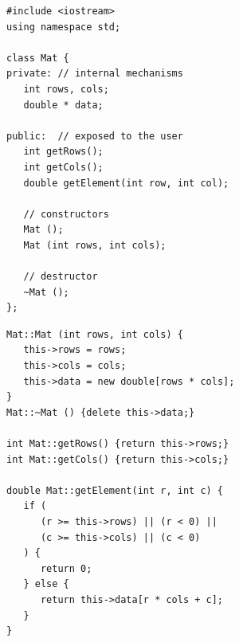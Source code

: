 \begin{frame}[fragile]
%
%
\begin{codebox}
\begin{verbatim}
#include <iostream>
using namespace std;

class Mat {
private: // internal mechanisms
   int rows, cols;
   double * data;
   
public:  // exposed to the user
   int getRows();
   int getCols();
   double getElement(int row, int col);

   // constructors
   Mat ();
   Mat (int rows, int cols);

   // destructor
   ~Mat ();
};
\end{verbatim}
\end{codebox}
%	
\begin{codebox}[... Fortsetzung ...]
\begin{verbatim}
Mat::Mat (int rows, int cols) {
   this->rows = rows;
   this->cols = cols;
   this->data = new double[rows * cols];
}
Mat::~Mat () {delete this->data;}

int Mat::getRows() {return this->rows;}
int Mat::getCols() {return this->cols;}

double Mat::getElement(int r, int c) {
   if (
      (r >= this->rows) || (r < 0) ||
      (c >= this->cols) || (c < 0)
   ) {
      return 0;
   } else {
      return this->data[r * cols + c];
   }
}
\end{verbatim}
\end{codebox}
%
\end{frame}


